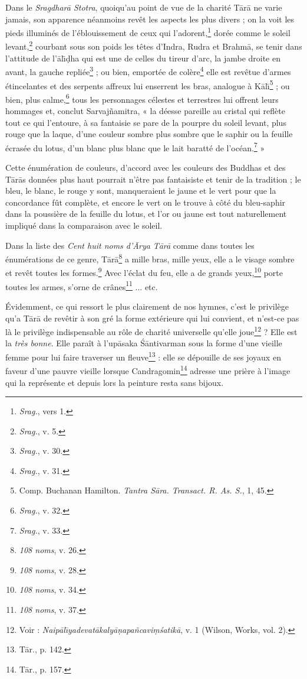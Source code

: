 \documentclass[a4paper, 11pt, oneside, french, landscape, twocolumn]{article}
\begin{document}
Dans le \emph{Sragdhar\={a} Stotra}, quoiqu'au point de vue de la charité T\={a}r\={a} ne varie jamais, son apparence néanmoins revêt les aspects les plus divers ; on la voit les pieds illuminés de l'éblouissement de ceux qui l'adorent,\footnote{\emph{Srag.}, vers 1.} dorée comme le soleil levant,\footnote{\emph{Srag.}, v. 5.} courbant sous son poids les têtes d'Indra, Rudra et Brahm\={a}, se tenir dans l'attitude de l'\={a}l\={\i}\d{d}ha qui est une de celles du tireur d'arc, la jambe droite en avant, la gauche repliée\footnote{\emph{Srag.}, v. 30.} ; ou bien, emportée de colère\footnote{\emph{Srag.}, v. 31.} elle est revêtue d'armes étincelantes et des serpents affreux lui enserrent les bras, analogue à K\={a}l\={\i}\footnote{Comp. Buchanan Hamilton. \emph{Tantra S\={a}ra. Transact. R. As. S.}, 1, 45.} ; ou bien, plus calme,\footnote{\emph{Srag.}, v. 32.} tous les personnages célestes et terrestres lui offrent leurs hommages et, conclut Sarvaj\~{n}amitra, « la déesse pareille au cristal qui reflète tout ce qui l'entoure, à sa fantaisie se pare de la pourpre du soleil levant, plus rouge que la laque, d'une couleur sombre plus sombre que le saphir ou la feuille écrasée du lotus, d'un blanc plus blanc que le lait baratté de l'océan.\footnote{\emph{Srag.}, v. 33.} »

Cette énumération de couleurs, d'accord avec les couleurs des Buddhas et des T\={a}r\={a}s données plus haut pourrait n'être pas fantaisiste et tenir de la tradition ; le bleu, le blanc, le rouge y sont, manqueraient le jaune et le vert pour que la concordance fût complète, et encore le vert on le trouve à côté du bleu-saphir dans la poussière de la feuille du lotus, et l'or ou jaune est tout naturellement impliqué dans la comparaison avec le soleil.

Dans la liste des \emph{Cent huit noms d'\={A}rya T\={a}r\={a}} comme dans toutes les énumérations de ce genre, T\={a}r\={a}\footnote{\emph{108 noms}, v. 26.} a mille bras, mille yeux, elle a le visage sombre et revêt toutes les formes.\footnote{\emph{108 noms}, v. 28.} Avec l'éclat du feu, elle a de grands yeux,\footnote{\emph{108 noms}, v. 34.} porte toutes les armes, s'orne de crânes\footnote{\emph{108 noms}, v. 37.} ... etc.

Évidemment, ce qui ressort le plus clairement de nos hymnes, c'est le privilège qu'a T\={a}r\={a} de revêtir à son gré la forme extérieure qui lui convient, et n'est-ce pas là le privilège indispensable au rôle de charité universelle qu'elle joue\footnote{Voir : \emph{Naip\={a}l\={\i}yadevat\={a}kaly\={a}\d{n}apa\~{n}cavi\d{m}\'{s}atik\={a}}, v. 1 (Wilson, Works, vol. 2).} ? Elle est la \emph{très bonne}. Elle paraît à l'up\={a}saka \'{S}\={a}ntivarman sous la forme d'une vieille femme pour lui faire traverser un fleuve\footnote{T\={a}r., p. 142.} : elle se dépouille de ses joyaux en faveur d'une pauvre vieille lorsque Candragomin\footnote{T\={a}r., p. 157.} adresse une prière à l'image qui la représente et depuis lors la peinture resta sans bijoux.
\clearpage
\end{document}
